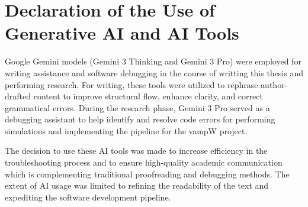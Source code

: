 \chapter{Declaration of the Use of Generative AI and AI Tools}




Google Gemini models (Gemini 3 Thinking and Gemini 3 Pro) were employed for writing assistance and software debugging in the course of writting this thesis and performing research. For writing, these tools were utilized to rephrase author-drafted content to improve structural flow, enhance clarity, and correct grammatical errors. During the research phase, Gemini 3 Pro served as a debugging assistant to help identify and resolve code errors for performing simulations and implementing the pipeline for the vampW project.

The decision to use these AI tools was made to increase efficiency in the troubleshooting process and to ensure high-quality academic communication which is complementing traditional proofreading and debugging methods. The extent of AI usage was limited to refining the readability of the text and expediting the software development pipeline.

